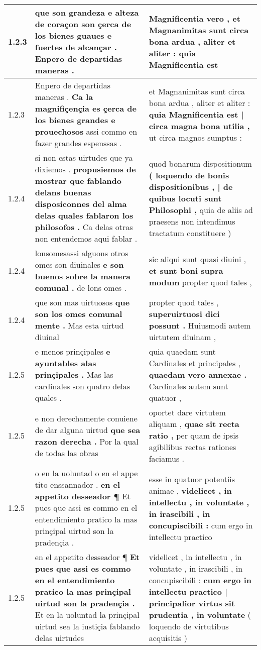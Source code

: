 \begin{tabular}{|p{1cm}|p{6.5cm}|p{6.5cm}|}
1.2.3 & que son grandeza e alteza de coraçon \textbf{ son çerca de los bienes guaues e fuertes de alcançar . } Enpero de departidas maneras . & Magnificentia vero , \textbf{ et Magnanimitas sunt circa bona ardua , aliter et aliter : } quia Magnificentia est \\\hline
1.2.3 & Enpero de departidas maneras . \textbf{ Ca la magnifiçençia es çerca de los bienes grandes e prouechosos } assi commo en fazer grandes espenssas . & et Magnanimitas sunt circa bona ardua , aliter et aliter : \textbf{ quia Magnificentia est | circa magna bona utilia , } ut circa magnos sumptus : \\\hline
1.2.4 & si non estas uirtudes que ya dixiemos . \textbf{ propusiemos de mostrar que fablando delans buenas disposiconnes del alma delas quales fablaron los philosofos . } Ca delas otras non entendemos aqui fablar . & quod bonarum dispositionum \textbf{ ( loquendo de bonis dispositionibus , | de quibus locuti sunt Philosophi , } quia de aliis ad praesens non intendimus tractatum constituere ) \\\hline
1.2.4 & lonsomesassi alguons otros omes son diuinales \textbf{ e son buenos sobre la manera comunal . } de lons omes . & sic aliqui sunt quasi diuini , \textbf{ et sunt boni supra modum } propter quod tales , \\\hline
1.2.4 & que son mas uirtuosos \textbf{ que son los omes comunal mente . } Mas esta uirtud diuinal & propter quod tales , \textbf{ superuirtuosi dici possunt . } Huiusmodi autem uirtutem diuinam , \\\hline
1.2.5 & e menos prinçipales \textbf{ e ayuntables alas prinçipales . } Mas las cardinales son quatro delas quales . & quia quaedam sunt Cardinales et principales , \textbf{ quaedam vero annexae . } Cardinales autem sunt quatuor , \\\hline
1.2.5 & e non derechamente conuiene de dar alguna uirtud \textbf{ que sea razon derecha . } Por la qual de todas las obras & oportet dare virtutem aliquam , \textbf{ quae sit recta ratio , } per quam de ipsis agibilibus rectas rationes faciamus . \\\hline
1.2.5 & o en la uoluntad o en el appe tito enssannador . \textbf{ en el appetito desseador ¶ } Et pues que assi es commo en el entendimiento pratico la mas prinçipal uirtud son la pradençia . & esse in quatuor potentiis animae , \textbf{ videlicet , in intellectu , in voluntate , in irascibili , in concupiscibili : } cum ergo in intellectu practico \\\hline
1.2.5 & en el appetito desseador ¶ \textbf{ Et pues que assi es commo en el entendimiento pratico la mas prinçipal uirtud son la pradençia . } Et en la uoluntad la prinçipal uirtud sea la iustiçia fablando delas uirtudes & videlicet , in intellectu , in voluntate , in irascibili , in concupiscibili : \textbf{ cum ergo in intellectu practico | principalior virtus sit prudentia , in voluntate } ( loquendo de virtutibus acquisitis ) \\\hline

\end{tabular}
